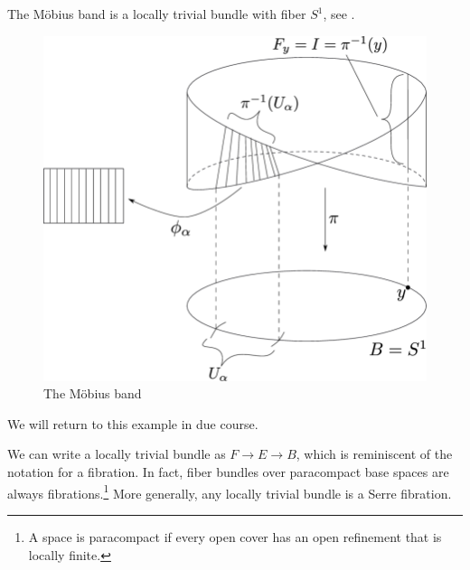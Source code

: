 \documentclass[ma3408.tex]{subfiles}
\begin{document}
\begin{Exa}\label{exa:mobius}
The M{\"o}bius band is a locally trivial bundle with fiber $S^1$, see . 
\begin{figure}[h!] \centering\includegraphics[scale = 0.25]{mob.png}\caption{The M{\"o}bius band}\label{fig:mob}\end{figure}
We will return to this example in due course. 
\end{Exa}
\begin{Rem}
We can write a locally trivial bundle as $F \to E \to B$, which is reminiscent of the notation for a fibration. In fact, fiber bundles over paracompact base spaces are always fibrations.\footnote{A space is paracompact if every open cover has an open refinement that is locally finite. } More generally, any locally trivial bundle is a Serre fibration. 
\end{Rem}
\end{document}
